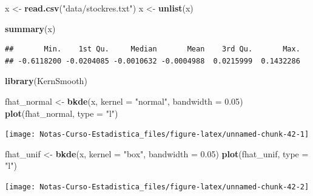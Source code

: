 \documentclass[
  12pt,
]{book}
\newenvironment{Shaded}{\begin{snugshade}}{\end{snugshade}}
\newcommand{\DataTypeTok}[1]{\textcolor[rgb]{0.13,0.29,0.53}{#1}}
\newcommand{\FloatTok}[1]{\textcolor[rgb]{0.00,0.00,0.81}{#1}}
\newcommand{\KeywordTok}[1]{\textcolor[rgb]{0.13,0.29,0.53}{\textbf{#1}}}
\newcommand{\NormalTok}[1]{#1}
\newcommand{\StringTok}[1]{\textcolor[rgb]{0.31,0.60,0.02}{#1}}
\theoremstyle{definition}
\theoremstyle{definition}
\theoremstyle{definition}
\theoremstyle{remark}
\begin{document}
\begin{Shaded}
\begin{Highlighting}[]
\NormalTok{x <-}\StringTok{ }\KeywordTok{read.csv}\NormalTok{(}\StringTok{"data/stockres.txt"}\NormalTok{)}
\NormalTok{x <-}\StringTok{ }\KeywordTok{unlist}\NormalTok{(x)}
\end{Highlighting}
\end{Shaded}

\begin{Shaded}
\begin{Highlighting}[]
\KeywordTok{summary}\NormalTok{(x)}
\end{Highlighting}
\end{Shaded}

\begin{verbatim}
##       Min.    1st Qu.     Median       Mean    3rd Qu.       Max. 
## -0.6118200 -0.0204085 -0.0010632 -0.0004988  0.0215999  0.1432286
\end{verbatim}

\begin{Shaded}
\begin{Highlighting}[]
\KeywordTok{library}\NormalTok{(KernSmooth)}

\NormalTok{fhat_normal <-}\StringTok{ }\KeywordTok{bkde}\NormalTok{(x, }\DataTypeTok{kernel =} \StringTok{"normal"}\NormalTok{, }\DataTypeTok{bandwidth =} \FloatTok{0.05}\NormalTok{)}
\KeywordTok{plot}\NormalTok{(fhat_normal, }\DataTypeTok{type =} \StringTok{"l"}\NormalTok{)}
\end{Highlighting}
\end{Shaded}

\begin{center}\texttt{[image: Notas-Curso-Estadistica\_files/figure-latex/unnamed-chunk-42-1]} \end{center}

\begin{Shaded}
\begin{Highlighting}[]
\NormalTok{fhat_unif <-}\StringTok{ }\KeywordTok{bkde}\NormalTok{(x, }\DataTypeTok{kernel =} \StringTok{"box"}\NormalTok{, }\DataTypeTok{bandwidth =} \FloatTok{0.05}\NormalTok{)}
\KeywordTok{plot}\NormalTok{(fhat_unif, }\DataTypeTok{type =} \StringTok{"l"}\NormalTok{)}
\end{Highlighting}
\end{Shaded}

\begin{center}\texttt{[image: Notas-Curso-Estadistica\_files/figure-latex/unnamed-chunk-42-2]} \end{center}
\end{document}
